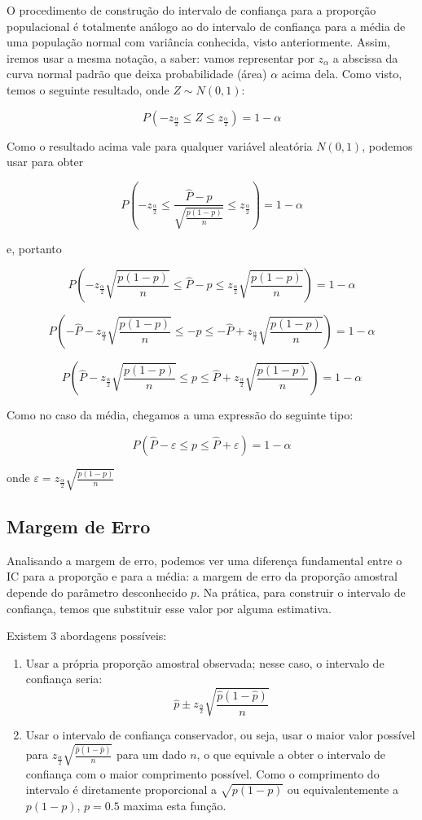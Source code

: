 \documentclass[
]{book}
\begin{document}
O procedimento de construção do intervalo de confiança para a proporção populacional é totalmente análogo ao do intervalo de confiança para a média de uma população normal com variância conhecida, visto anteriormente. Assim, iremos usar a mesma notação, a saber: vamos representar por \(z_\alpha\) a abscissa da curva normal padrão que deixa probabilidade (área) \(\alpha\) acima dela. Como visto, temos o seguinte resultado, onde \(Z\sim N(0,1)\):

\[P\left(-z_\frac{\alpha}{2}\leq Z \leq z_\frac{\alpha}{2}\right)=1-\alpha\]

Como o resultado acima vale para qualquer variável aleatória \(N(0,1)\), podemos usar para obter

\[P\left(-z_{\frac{\alpha}{2}}\leq \frac{\hat P - p}{\sqrt{\frac{p(1-p)}{n}}} \leq z_{\frac{\alpha}{2}}\right)=1-\alpha\]

e, portanto

\[P\left(-z_{\frac{\alpha}{2}}\sqrt{\frac{p(1-p)}{n}} \leq \hat P - p \leq z_{\frac{\alpha}{2}}\sqrt{\frac{p(1-p)}{n}}\right)=1-\alpha\]

\[P\left(-\hat P -z_{\frac{\alpha}{2}}\sqrt{\frac{p(1-p)}{n}} \leq - p \leq -\hat P + z_{\frac{\alpha}{2}}\sqrt{\frac{p(1-p)}{n}}\right)=1-\alpha\]

\[P\left(\hat P - z_{\frac{\alpha}{2}}\sqrt{\frac{p(1-p)}{n}} \leq p \leq \hat P + z_{\frac{\alpha}{2}}\sqrt{\frac{p(1-p)}{n}}\right)=1-\alpha\]

Como no caso da média, chegamos a uma expressão do seguinte tipo:

\[P(\hat P -\varepsilon\leq p\leq\hat P + \varepsilon)=1-\alpha\]

onde \(\varepsilon=z_{\frac{\alpha}{2}}\sqrt{\frac{p(1-p)}{n}}\)

\hypertarget{margem-de-erro-2}{%
\subsection{Margem de Erro}\label{margem-de-erro-2}}

Analisando a margem de erro, podemos ver uma diferença fundamental entre o IC para a proporção e para a média: a margem de erro da proporção amostral depende do parâmetro desconhecido \(p\). Na prática, para construir o intervalo de confiança, temos que substituir esse valor por alguma estimativa.

Existem 3 abordagens possíveis:

\begin{enumerate}
\def\labelenumi{\arabic{enumi}.}
\item
  Usar a própria proporção amostral observada; nesse caso, o intervalo de confiança seria: \[\hat p \pm z_{\frac{\alpha}{2}}\sqrt{\frac{\hat p(1-\hat p)}{n}}\]
\item
  Usar o intervalo de confiança conservador, ou seja, usar o maior valor possível para \(z_{\frac{\alpha}{2}}\sqrt{\frac{\hat p(1-\hat p)}{n}}\) para um dado \(n\), o que equivale a obter o intervalo de confiança com o maior comprimento possível. Como o comprimento do intervalo é diretamente proporcional a \(\sqrt{p(1-p)}\) ou equivalentemente a \(p(1-p)\), \(p=0.5\) maxima esta função.
\end{enumerate}
\end{document}
